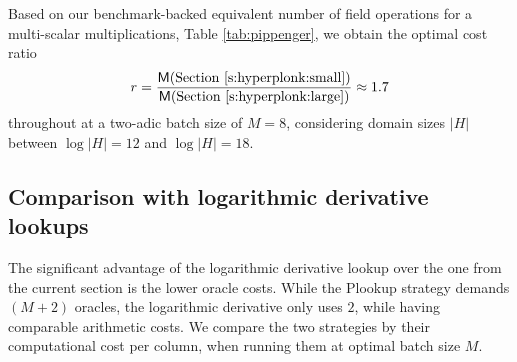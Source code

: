\documentclass[11pt]{article}
\theoremstyle{definition}
\theoremstyle{definition}
\begin{document}
Based on our benchmark-backed equivalent number of field operations for a multi-scalar multiplications, Table \ref{tab:pippenger}, we obtain the optimal cost ratio
\[
r = \frac{\mathsf M(\text{Section \ref{s:hyperplonk:small}})}{\mathsf M(\text{Section \ref{s:hyperplonk:large}})}\approx 1.7
\]
throughout at a two-adic batch size of $M=8$, considering domain sizes $|H|$ between $\log|H|=12$ and $\log|H|=18$.
%

\subsection{Comparison with logarithmic derivative lookups}

The significant advantage of the logarithmic derivative lookup over the one from the current section is the lower oracle costs.
While the Plookup strategy demands $(M + 2)$ oracles, the logarithmic derivative only uses $2$, while having comparable arithmetic costs. 
We compare the two strategies by their computational cost per column, when running them at optimal batch size $M$.
\end{document}
